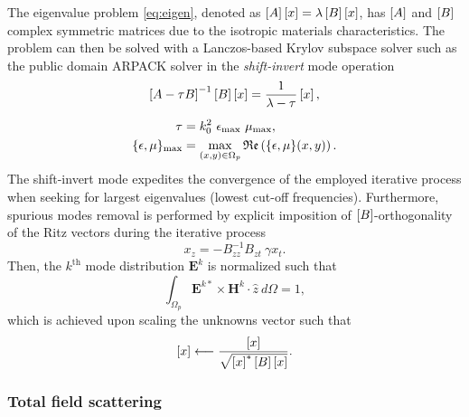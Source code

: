 The eigenvalue problem \eqref{eq:eigen}, denoted as $\left[A\right]\left[{{x}}\right] = \lambda \left[B\right]\left[{{x}}\right]$, has $\left[A\right]$ and $\left[B\right]$ complex symmetric matrices due to the isotropic materials characteristics. The problem can then be solved with a Lanczos-based Krylov subspace solver \cite{farle2004finite} such as the public domain ARPACK solver	\cite{lehoucq1998arpack} in the \textit{shift-invert} mode operation
%
\begin{gather}
\left[ A-\tau B \right]^{-1} \left[B\right] \left[{{x}}\right] =  \frac{1}{\lambda-\tau} \left[{{x}}\right], \nonumber \\[5pt]
\begin{aligned}
\tau &= k_0^2 \ \epsilon_\text{max} \ \mu_\text{max}, \\
\{\epsilon,\mu\}_\text{max} &= \max\limits_{(x,y)\in\Omega_p} \mathfrak{Re}\left( \{\epsilon,\mu\}(x,y) \right).
\end{aligned} \nonumber
\end{gather}
%
\noindent The shift-invert mode expedites the convergence of the employed iterative process when seeking for largest eigenvalues (lowest cut-off frequencies). Furthermore, spurious modes removal is performed by explicit imposition of $\left[B\right]$-orthogonality of the Ritz vectors during the iterative process
%
$$
x_{z}  = - B_{zz}^{-1} B_{zt} \ \gamma x_{t}.
$$
%
Then, the $k^\mathrm{th}$ mode distribution $\mathbf{E}^k$ is normalized such that
%
$$
\int_{\Omega_p}  \mathbf{E}^{k*}  \times  \mathbf{H}^k  \cdot \hat{z} \ d\Omega = 1,
$$
%
\noindent which is achieved upon scaling the unknowns vector such that 
$$ \left[{{x}}\right] \longleftarrow \frac{\left[{{x}}\right]}{\sqrt{ \left[{{x}}\right]^* \left[B\right] \left[{{x}}\right]} }.$$

\subsubsection{Total field scattering}

